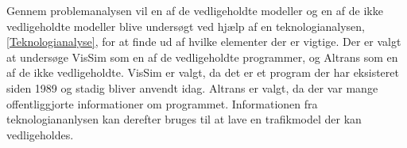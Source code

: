 \vspace{5mm}

Gennem problemanalysen vil en af de vedligeholdte modeller og en af de ikke vedligeholdte modeller blive undersøgt ved hjælp af en teknologianalysen, \ref{Teknologianalyse}, for at finde ud af hvilke elementer der er vigtige. Der er valgt at undersøge VisSim som en af de vedligeholdte programmer, og Altrans som en af de ikke vedligeholdte. VisSim er valgt, da det er et program der har eksisteret siden 1989 og stadig bliver anvendt idag. Altrans er valgt, da der var mange offentliggjorte informationer om programmet. Informationen fra teknologiananlysen kan derefter bruges til at lave en trafikmodel der kan vedligeholdes.